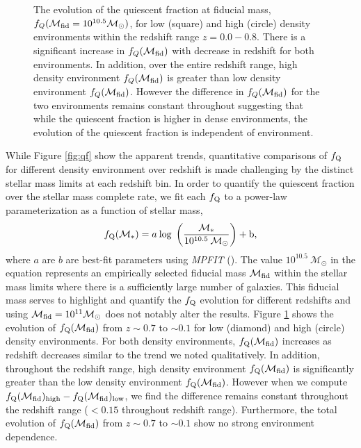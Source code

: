 \documentclass{emulateapj}
\begin{document}
\begin{figure}
    \begin{center}
        \leavevmode
        \caption{The evolution of the quiescent fraction at fiducial mass, $f_{Q}(\mathcal{M}_{\rm{fid}} = 10^{10.5} \mathcal{M}_\odot)$, for low (square) and high (circle) density environments within the redshift range $z = 0.0 - 0.8$.  There is a significant increase in $f_{Q}(\mathcal{M}_{\rm{fid}})$ with decrease in redshift for both environments. In addition, over the entire redshift range, high density environment $f_{Q}(\mathcal{M}_{\rm{fid}})$ is greater than low density environment $f_{Q}(\mathcal{M}_{\rm{fid}})$. However the difference in $f_{Q}(\mathcal{M}_{\rm{fid}})$ for the two environments remains constant throughout suggesting that while the quiescent fraction is higher in dense environments, the evolution of the quiescent fraction is independent of environment.}         \label{fig:qffit}
    \end{center}
\end{figure}

While Figure \ref{fig:qf} show the apparent trends, quantitative comparisons of $f_{\rm{Q}}$ for different density environment over redshift is made challenging by the distinct stellar mass limits at each redshift bin. In order to quantify the quiescent fraction over the stellar mass complete rate, we fit each $f_{\rm{Q}}$ to a power-law parameterization as a function of stellar mass, 
\begin{equation} 
f_{\rm{Q}}(\mathcal{M}_{*}) = a \: \rm{log} \; \left(\frac{ \mathcal{M}_{*}}{10^{10.5} \: \mathcal{M}_{\odot}} \right)+b,
\end{equation}
where $a$ are $b$ are best-fit parameters using {\em MPFIT} (\cite{Markwardt:2009aa}). The value $10^{10.5} \: \mathcal{M}_{\odot}$ in the equation represents an empirically selected fiducial mass $\mathcal{M}_{\rm{fid}}$ within the stellar mass limits where there is a sufficiently large number of galaxies. This fiducial mass serves to highlight and quantify the $f_{\rm{Q}}$ evolution for different redshifts and using $\mathcal{M}_{\rm{fid}} = 10^{11} \mathcal{M}_\odot$ does not notably alter the results. Figure \ref{fig:qffit} shows the evolution of $f_{\rm{Q}}(\mathcal{M}_{\rm{fid}})$ from $z \sim 0.7$ to $\sim 0.1$ for low (diamond) and high (circle) density environments. For both density environments, $f_{\rm{Q}}(\mathcal{M}_{\rm{fid}})$ increases as redshift decreases similar to the trend we noted qualitatively. In addition, throughout the redshift range, high density environment $f_{\rm{Q}}(\mathcal{M}_{\rm{fid}})$ is significantly greater than the low density environment $f_{\rm{Q}}(\mathcal{M}_{\rm{fid}})$. However when we compute $f_{\rm{Q}}(\mathcal{M}_{\rm{fid}})_{\rm{high}} - f_{\rm{Q}}(\mathcal{M}_{\rm{fid}})_{\rm{low}}$, we find the difference remains constant throughout the redshift range ($ < 0.15$ throughout redshift range). Furthermore, the total evolution of $f_{\rm{Q}}(\mathcal{M}_{\rm{fid}})$ from $z \sim 0.7$ to $\sim 0.1$ show no strong environment dependence. 
\end{document}
